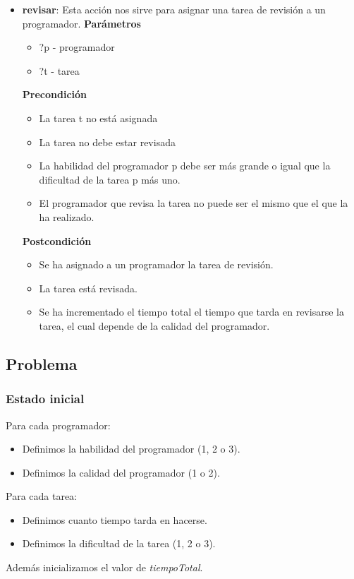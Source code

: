 \documentclass[11pt]{article}
\begin{document}
\begin{itemize}
	\item \textbf{revisar}: Esta acción nos sirve para asignar una tarea de revisión a un programador. 
	\textbf{Parámetros}
	\begin{itemize}
		\item ?p - programador
		\item ?t - tarea
	\end{itemize}
	\textbf{Precondición}
	\begin{itemize}
		\item La tarea t no está asignada
		\item La tarea no debe estar revisada
		\item La habilidad del programador p debe ser más grande o igual que la dificultad de la tarea p más uno.
		\item El programador que revisa la tarea no puede ser el mismo que el que la ha realizado. 
	\end{itemize}
	\textbf{Postcondición}
	\begin{itemize}	
		\item Se ha asignado a un programador la tarea de revisión.
		\item La tarea está revisada. 
		\item Se ha incrementado el tiempo total el tiempo que tarda en revisarse la tarea, el cual depende de la calidad del programador.
	\end{itemize}
	
\end{itemize}

\subsection{Problema}
\subsubsection{Estado inicial}
\noindent
Para cada programador:
\begin{itemize}
  	\item Definimos la habilidad del programador (1, 2 o 3).
  	\item Definimos la calidad del programador (1 o 2).
\end{itemize}

Para cada tarea:
\begin{itemize}
  	\item Definimos cuanto tiempo tarda en hacerse.
  	\item Definimos la dificultad de la tarea (1, 2 o 3).
\end{itemize}
Además inicializamos el valor de \textit{tiempoTotal}. 
\end{document}
